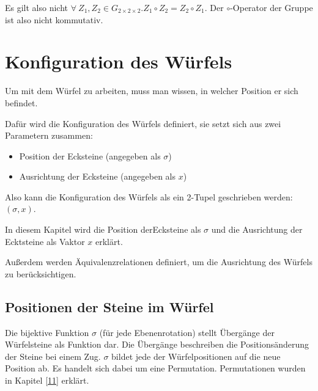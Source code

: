 \documentclass[12pt,a4paper, usenames, dvipsnames]{article}
\newcommand{\Gtwo}{\ensuremath{G_{2\times 2\times 2}}}
\begin{document}
Es gilt also nicht $\forall \  Z_1, Z_2 \in \Gtwo. Z_1 \circ Z_2 = Z_2 \circ Z_1$. Der $\circ$-Operator der Gruppe ist also nicht kommutativ. 

%
%
%
%
%
%
%
%
%
%
%
%
%
%
%
%
%
%
%
%
\newpage

\section{Konfiguration des Würfels}
Um mit dem Würfel zu arbeiten, muss man wissen, in welcher Position er sich befindet.

Dafür wird die Konfiguration des Würfels definiert, sie setzt sich aus zwei Parametern zusammen: 
\begin{itemize}
\item Position der Ecksteine (angegeben als $\sigma$)
\item Ausrichtung der Ecksteine (angegeben als $x$)
\end{itemize}
Also kann die Konfiguration des Würfels als ein 2-Tupel geschrieben werden: $(\sigma, x)$.


In diesem Kapitel wird die Position derEcksteine als $\sigma$ und die Ausrichtung der Ecktsteine als Vaktor $x$ erklärt. 

Außerdem werden Äquivalenzrelationen definiert, um die Ausrichtung des Würfels zu berücksichtigen.

%
%
%
%
%
%
%
%
%
%
%
%
%
%
%
%
%
%
%
%
\subsection*{Positionen der Steine im Würfel} 

Die bijektive Funktion $\sigma$ (für jede Ebenenrotation) stellt Übergänge der Würfelsteine als Funktion dar. Die Übergänge beschreiben die Positionsänderung der Steine bei einem Zug. $\sigma$ bildet jede der Würfelpositionen auf die neue Position ab. Es handelt sich dabei um eine Permutation. Permutationen wurden in Kapitel \ref{11} erklärt. 
\end{document}
